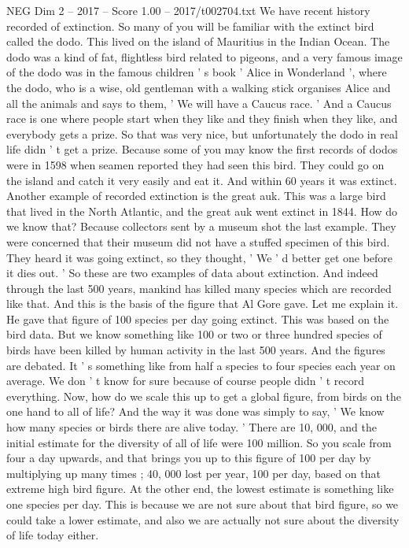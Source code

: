 \begin{textsample}{NEG Dim 2 – 2017 – Score 1.00 – 2017/t002704.txt}
We have recent history recorded of extinction.
So many of you will be familiar with the extinct bird called the dodo.
This lived on the island of Mauritius in the Indian Ocean.
The dodo was a kind of fat, flightless bird related to pigeons, and a very famous image of the dodo was in the famous children ' s book ' Alice in Wonderland ', where the dodo, who is a wise, old gentleman with a walking stick organises Alice and all the animals and says to them, ' We will have a Caucus race. ' And a Caucus race is one where people start when they like and they finish when they like, and everybody gets a prize.
So that was very nice, but unfortunately the dodo in real life didn ' t get a prize.
Because some of you may know the first records of dodos were in 1598 when seamen reported they had seen this bird.
They could go on the island and catch it very easily and eat it.
And within 60 years it was extinct.
Another example of recorded extinction is the great auk.
This was a large bird that lived in the North Atlantic, and the great auk went extinct in 1844.
How do we know that?
Because collectors sent by a museum shot the last example.
They were concerned that their museum did not have a stuffed specimen of this bird.
They heard it was going extinct, so they thought, ' We ' d better get one before it dies out. ' So these are two examples of data about extinction.
And indeed through the last 500 years, mankind has killed many species which are recorded like that.
And this is the basis of the figure that Al Gore gave.
Let me explain it.
He gave that figure of 100 species per day going extinct.
This was based on the bird data.
But we know something like 100 or two or three hundred species of birds have been killed by human activity in the last 500 years.
And the figures are debated.
It ' s something like from half a species to four species each year on average.
We don ' t know for sure because of course people didn ' t record everything.
Now, how do we scale this up to get a global figure, from birds on the one hand to all of life?
And the way it was done was simply to say, ' We know how many species or birds there are alive today. ' There are 10, 000, and the initial estimate for the diversity of all of life were 100 million.
So you scale from four a day upwards, and that brings you up to this figure of 100 per day by multiplying up many times ; 40, 000 lost per year, 100 per day, based on that extreme high bird figure.
At the other end, the lowest estimate is something like one species per day.
This is because we are not sure about that bird figure, so we could take a lower estimate, and also we are actually not sure about the diversity of life today either.

\end{textsample}
